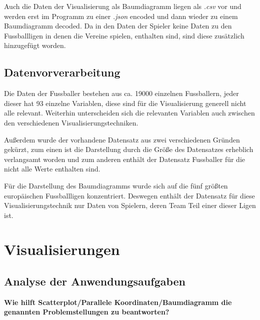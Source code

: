 \documentclass[usegeometry=true]{scrartcl}
\begin{document}
Auch die Daten der Visualisierung als Baumdiagramm liegen als \textit{.csv} vor und werden erst im Programm zu einer \textit{.json} encoded und dann wieder zu einem Baumdiagramm decoded. Da in den Daten der Spieler keine Daten zu den Fussballligen in denen die Vereine spielen, enthalten sind, sind diese zusätzlich hinzugefügt worden.

\subsection{\label{Datenvorverarbeitung}Datenvorverarbeitung}

Die Daten der Fussballer bestehen aus ca. 19000 einzelnen Fussballern, jeder dieser hat 93 einzelne Variablen, diese sind für die Visualisierung generell nicht alle relevant. Weiterhin unterscheiden sich die relevanten Variablen auch zwischen den verschiedenen Visualisierungstechniken.

Außerdem wurde der vorhandene Datensatz aus zwei verschiedenen Gründen gekürzt, zum einen ist die Darstellung durch die Größe des Datensatzes erheblich verlangsamt worden und zum anderen enthält der Datensatz Fussballer für die nicht alle Werte enthalten sind.

Für die Darstellung des Baumdiagramms wurde sich auf die fünf größten europäischen Fussballligen konzentriert. Deswegen enthält der Datensatz für diese Visualisierungstechnik nur Daten von Spielern, deren Team Teil einer dieser Ligen ist.

\section{Visualisierungen}
\subsection{Analyse der Anwendungsaufgaben}

\textbf{Wie hilft Scatterplot/Parallele Koordinaten/Baumdiagramm die genannten Problemstellungen zu beantworten?}
\end{document}
